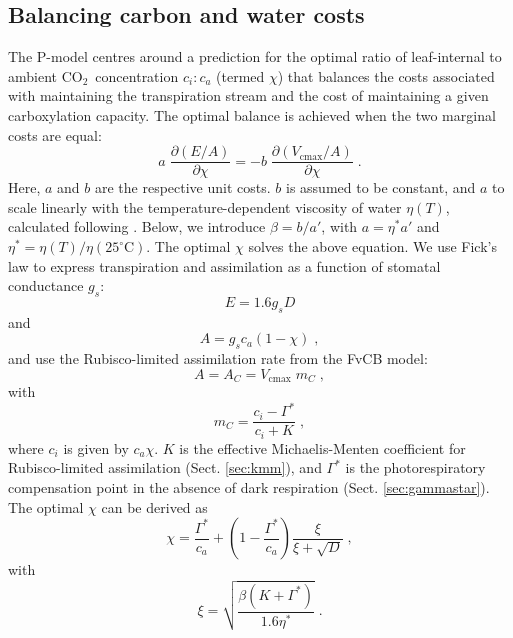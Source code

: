 \documentclass{myreport}
\newcommand{\coo}{CO$_2$}
\begin{document}
\subsection{Balancing carbon and water costs}
\label{sec:watercarbon}
The P-model centres around a prediction for the optimal ratio of leaf-internal to ambient \coo\ concentration $c_i:c_a$ (termed $\chi$) that balances the costs associated with maintaining the transpiration stream and the cost of maintaining a given carboxylation capacity. The optimal balance is achieved when the two marginal costs are equal: 
\begin{equation}
\label{eq:optimality_chi}
a \; \frac{\partial (E/A)}{\partial \chi} = -b \; \frac{\partial (V_{\mathrm{cmax}}/A)}{\partial \chi}\;.
\end{equation}
Here, $a$ and $b$ are the respective unit costs. $b$ is assumed to be constant, and $a$ to scale linearly with the temperature-dependent viscosity of water $\eta(T)$, calculated following \citet{huber09}. Below, we introduce $\beta = b / a'$, with $a = \eta^\ast a'$ and $\eta^\ast = \eta(T) / \eta(25^{\circ}\text{C})$. The optimal $\chi$ solves the above equation. We use Fick's law \citep{fick1855} to express transpiration and assimilation as a function of stomatal conductance $g_s$: 
\begin{equation}
\label{eq:egs}
    E = 1.6 g_s D
\end{equation}
and 
\begin{equation}
\label{eq:ags}
    A = g_s c_a (1-\chi) \;,
\end{equation}
and use the Rubisco-limited assimilation rate from the FvCB model:
\begin{equation}
\label{eq:ac}
    A = A_C = V_{\mathrm{cmax}} \; m_C \;,
\end{equation}
with
\begin{equation}
\label{eq:mc}
   m_C = \frac{c_i - \Gamma^{\ast}}{c_i + K}\;,
\end{equation}
where $c_i$ is given by $c_a \chi$. $K$ is the effective Michaelis-Menten coefficient for Rubisco-limited assimilation (Sect. \ref{sec:kmm}), and $\Gamma^{\ast}$ is the photorespiratory compensation point in the absence of dark respiration (Sect. \ref{sec:gammastar}). The optimal $\chi$ can be derived as
\begin{equation}
\label{eq:chiopt}
\chi = \frac{\Gamma^{\ast}}{c_a} + \left(1- \frac{\Gamma^{\ast}}{c_a}\right) \frac{\xi}{\xi + \sqrt{D}}\;,
\end{equation}
with 
\begin{equation}
\label{eq:xi}
\xi = \sqrt{\frac{\beta (K+\Gamma^{\ast})}{1.6 \eta^{\ast}}}\;.
\end{equation}
\end{document}
